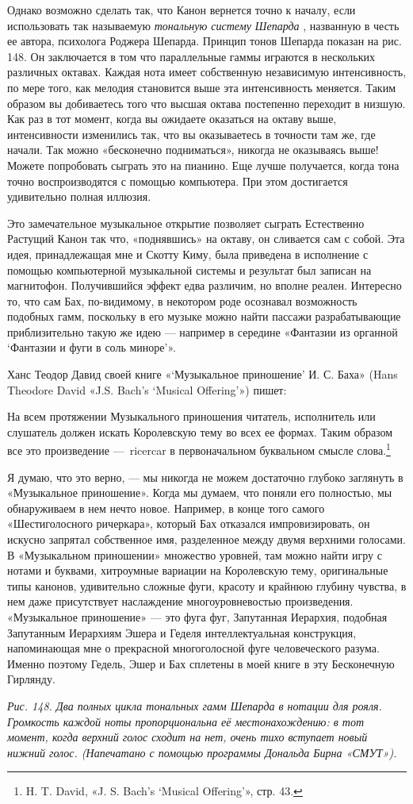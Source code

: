 \documentclass[../main.tex]{subfiles}
\begin{document}
Однако возможно сделать так, что Канон вернется точно к началу, если использовать так называемую \emph{тональную систему Шепарда} , названную в честь ее автора, психолога Роджера Шепарда. Принцип тонов Шепарда показан на рис. 148. Он заключается в том что параллельные гаммы играются в нескольких различных октавах. Каждая нота имеет собственную независимую интенсивность, по мере того, как мелодия становится выше эта интенсивность меняется. Таким образом вы добиваетесь того что высшая октава постепенно переходит в низшую. Как раз в тот момент, когда вы ожидаете оказаться на октаву выше, интенсивности изменились так, что вы оказываетесь в точности там же, где начали. Так можно «бесконечно подниматься», никогда не оказываясь выше! Можете попробовать сыграть это на пианино. Еще лучше получается, когда тона точно воспроизводятся с помощью компьютера. При этом достигается удивительно полная иллюзия.

Это замечательное музыкальное открытие позволяет сыграть Естественно Растущий Канон так что, «поднявшись» на октаву, он сливается сам с собой. Эта идея, принадлежащая мне и Скотту Киму, была приведена в исполнение с помощью компьютерной музыкальной системы и результат был записан на магнитофон. Получившийся эффект едва различим, но вполне реален. Интересно то, что сам Бах, по-видимому, в некотором роде осознавал возможность подобных гамм, поскольку в его музыке можно найти пассажи разрабатывающие приблизительно такую же идею --- например в середине «Фантазии из органной \enquote*{Фантазии и фуги в соль миноре}».

Ханс Теодор Давид своей книге «\enquote*{Музыкальное приношение} И. С. Баха» (Hans Theodore David «J.S. Bach's \enquote*{Musical Offering}») пишет:

На всем протяжении Музыкального приношения читатель, исполнитель или слушатель должен искать Королевскую тему во всех ее формах. Таким образом все это произведение ---~ricercar в первоначальном буквальном смысле слова.\footnote{H. T. David, «J. S. Bach's \enquote*{Musical Offering}», стр. 43.}

Я думаю, что это верно, --- мы никогда не можем достаточно глубоко заглянуть в «Музыкальное приношение». Когда мы думаем, что поняли его полностью, мы обнаруживаем в нем нечто новое. Например, в конце того самого «Шестиголосного ричеркара», который Бах отказался импровизировать, он искусно запрятал собственное имя, разделенное между двумя верхними голосами. В «Музыкальном приношении» множество уровней, там можно найти игру с нотами и буквами, хитроумные вариации на Королевскую тему, оригинальные типы канонов, удивительно сложные фуги, красоту и крайнюю глубину чувства, в нем даже присутствует наслаждение многоуровневостью произведения. «Музыкальное приношение» --- это фуга фуг, Запутанная Иерархия, подобная Запутанным Иерархиям Эшера и Геделя интеллектуальная конструкция, напоминающая мне о прекрасной многоголосной фуге человеческого разума. Именно поэтому Гедель, Эшер и Бах сплетены в моей книге в эту Бесконечную Гирлянду.

\emph{Рис. 148. Два полных цикла тональных гамм Шепарда в нотации для рояля. Громкость каждой ноты пропорциональна её местонахождению: в тот момент, когда верхний голос сходит на нет, очень тихо вступает новый нижний голос. (Напечатано с помощью программы Дональда Бирна «СМУТ»).}
\end{document}
